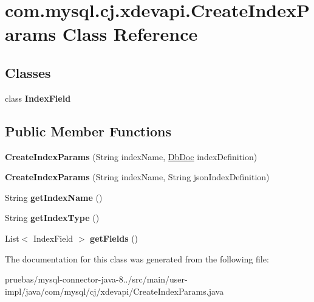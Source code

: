 \hypertarget{classcom_1_1mysql_1_1cj_1_1xdevapi_1_1_create_index_params}{}\section{com.\+mysql.\+cj.\+xdevapi.\+Create\+Index\+Params Class Reference}
\label{classcom_1_1mysql_1_1cj_1_1xdevapi_1_1_create_index_params}
\subsection*{Classes}
\begin{DoxyCompactItemize}
\item 
class {\bfseries Index\+Field}
\end{DoxyCompactItemize}
\subsection*{Public Member Functions}
\begin{DoxyCompactItemize}
\item 
\mbox{\label{classcom_1_1mysql_1_1cj_1_1xdevapi_1_1_create_index_params_a4b60834b272fa92eedcfd657357ef3b2}} 
{\bfseries Create\+Index\+Params} (String index\+Name, \mbox{\hyperlink{interfacecom_1_1mysql_1_1cj_1_1xdevapi_1_1_db_doc}{Db\+Doc}} index\+Definition)
\item 
\mbox{\label{classcom_1_1mysql_1_1cj_1_1xdevapi_1_1_create_index_params_ace495890fd81e353187523415afabb0a}} 
{\bfseries Create\+Index\+Params} (String index\+Name, String json\+Index\+Definition)
\item 
\mbox{\label{classcom_1_1mysql_1_1cj_1_1xdevapi_1_1_create_index_params_a4f866cc4a1ca10a230ea290e065122f3}} 
String {\bfseries get\+Index\+Name} ()
\item 
\mbox{\label{classcom_1_1mysql_1_1cj_1_1xdevapi_1_1_create_index_params_a75dc333dcf689c02cdeb2255decde50e}} 
String {\bfseries get\+Index\+Type} ()
\item 
\mbox{\label{classcom_1_1mysql_1_1cj_1_1xdevapi_1_1_create_index_params_a1b419ee66153e3e41cefc9492e97f393}} 
List$<$ Index\+Field $>$ {\bfseries get\+Fields} ()
\end{DoxyCompactItemize}


The documentation for this class was generated from the following file\+:\begin{DoxyCompactItemize}
\item 
pruebas/mysql-\/connector-\/java-\/8../src/main/user-\/impl/java/com/mysql/cj/xdevapi/Create\+Index\+Params.\+java\end{DoxyCompactItemize}
